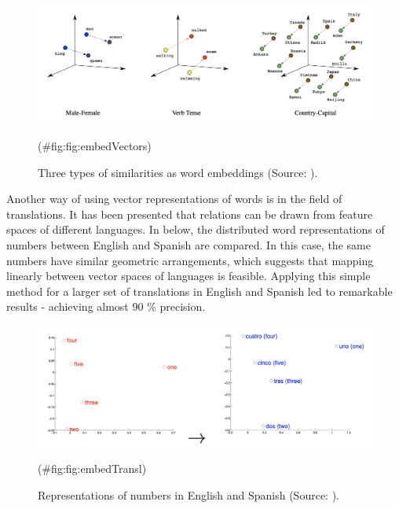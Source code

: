 \documentclass[
]{krantz}
\begin{document}
\begin{figure}

{\centering \includegraphics[width=1\linewidth]{./figures/01-01-nlp/embed_vectors_google} 

}

\caption{Three types of similarities as word embeddings (Source: \citet{Google2022}).}(\#fig:fig:embedVectors)
\end{figure}



Another way of using vector representations of words is in the field of
translations. It has been presented that relations can be drawn from
feature spaces of different languages. In below, the distributed word
representations of numbers between English and Spanish are compared. In
this case, the same numbers have similar geometric arrangements, which
suggests that mapping linearly between vector spaces of languages is
feasible. Applying this simple method for a larger set of translations
in English and Spanish led to remarkable results - achieving almost 90 \%
precision.

\begin{figure}

{\centering \includegraphics[width=0.9\linewidth]{./figures/01-01-nlp/embed_transl_mikolova_p2} 

}

\caption{Representations of numbers in English and Spanish (Source: \citet{Mikolov2013a}).}(\#fig:fig:embedTransl)
\end{figure}
\end{document}
